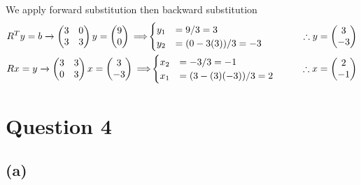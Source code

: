 \documentclass[12pt]{article}
\let\oldimplies\implies
\renewcommand*{\implies}{
	\hspace{-0.05cm}\resizebox{.95\width}{\height}{$\oldimplies$}\hspace{-0.05cm}
}
\begin{document}
			We apply forward substitution then backward substitution 
			\begin{align*}
				&R^{T}y = b \xrightarrow{} \begin{pmatrix}
					3 & 0 \\ 3  & 3
				\end{pmatrix}y = \begin{pmatrix}
					9 \\ 0 
				\end{pmatrix} 
				\ \implies \begin{cases}
					y_{1} & = 9/3 = 3 \\ 
					y_{2} &= (0-3(3))/3 = -3
				\end{cases}
				\qquad &\therefore y = \begin{pmatrix}
					3 \\ -3 
				\end{pmatrix} \\
				&Rx = y \xrightarrow{} \begin{pmatrix}
				3 & 3 \\ 0  & 3
				\end{pmatrix}x = \begin{pmatrix}
				3 \\ -3
				\end{pmatrix} 
				\ \implies \begin{cases}
					x_{2} &= -3/3 =-1 \\ 
					x_{1} &= (3-(3)(-3))/3 =2
				\end{cases}
				\qquad &\therefore x = \begin{pmatrix}
					2 \\ -1
				\end{pmatrix}
			\end{align*}
	\section*{Question 4}
		\subsection*{(a)}
		
\end{document}
